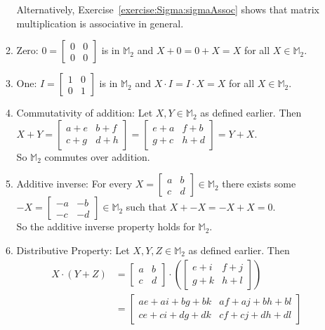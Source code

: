 \begin{enumerate}[(a)]
\begin{enumerate}[(1)]
Alternatively, Exercise~\ref{exercise:Sigma:sigmaAssoc} shows that matrix multiplication is associative in general.
\item Zero:  $0=
\begin{bmatrix}
0 & 0\\
0 & 0
\end{bmatrix}$
is in ${\mathbb M}_2$ and $X+0=0+X=X$ for all $X\in{\mathbb M}_2$. 
\item One:  $I=
\begin{bmatrix}
1 & 0\\
0 & 1
\end{bmatrix}$
is in ${\mathbb M}_2$ and $X\cdot I=I\cdot X=X$ for all $X\in{\mathbb M}_2$.
\item Commutativity of addition:  Let $X,Y\in{\mathbb M}_2$ as defined earlier.  Then $X+Y=
\begin{bmatrix}
a+e & b+f\\
c+g & d+h
\end{bmatrix}=
\begin{bmatrix}
e+a & f+b\\
g+c & h+d
\end{bmatrix}
=Y+X$.\\  
So ${\mathbb M}_2$ commutes over addition.
\item Additive inverse:  For every $X=
\begin{bmatrix}
a & b\\
c & d
\end{bmatrix}
\in{\mathbb M}_2$ there exists some $-X=
\begin{bmatrix}
-a & -b\\
-c & -d
\end{bmatrix}
\in{\mathbb M}_2$ such that $X+-X=-X+X=0$.\\  
So the additive inverse property holds for ${\mathbb M}_2$.
\item Distributive Property:  Let $X,Y,Z\in{\mathbb M}_2$ as defined earlier.  Then 
\begin{align*}
X\cdot(Y+Z)&=
\begin{bmatrix}
a & b\\
c & d
\end{bmatrix}
\cdot\left(
\begin{bmatrix}
e+i & f+j\\
g+k & h+l
\end{bmatrix}
\right)\\
&=
\begin{bmatrix}
ae+ai+bg+bk & af+aj+bh+bl\\
ce+ci+dg+dk & cf+cj+dh+dl

\end{bmatrix}
\end{align*}
\end{enumerate}
\end{enumerate}
